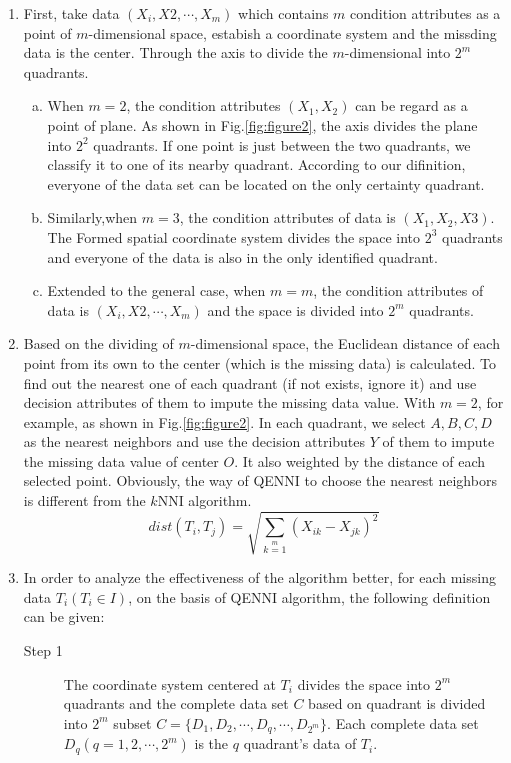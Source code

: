 \documentclass[print]{jicspack}
\begin{document}
\begin{enumerate}[(1)]
\item First, take data $(X_i, X2, \cdots, X_m)$ which contains $m$ condition attributes as a point of $m$-dimensional space, estabish a coordinate system and the missding data is the center. Through the axis to divide the $m$-dimensional into $2^m$ quadrants.
  \begin{enumerate}[a.]
  \item When $m = 2$, the condition attributes $(X_1, X_2)$ can be regard as a point of plane. As shown in Fig.\ref{fig:figure2}, the axis divides the plane into $2^2$ quadrants. If one point is just between the two quadrants, we classify it to one of its nearby quadrant. According to our difinition, everyone of the data set can be located on the only certainty quadrant.
  \item Similarly,when $m = 3$, the condition attributes of data is $(X_1, X_2, X3)$. The Formed spatial coordinate system divides the space into $2^3$ quadrants and everyone of the data is also in the only identified quadrant.
  \item Extended to the general case, when $m = m$, the condition attributes of data is $(X_i, X2, \cdots, X_m)$ and the space is divided into $2^m$ quadrants.
  \end{enumerate}
\item Based on the dividing of $m$-dimensional space, the Euclidean distance of each point from its own to the center (which is the missing data) is calculated. To find out the nearest one of each quadrant (if not exists, ignore it) and use decision attributes of them to impute the missing data value. With $m = 2$, for example, as shown in Fig.\ref{fig:figure2}. In each quadrant,  we select $A, B, C, D$ as the nearest neighbors and use the decision attributes $Y$ of them to impute the missing data value of center $O$. It also weighted by the distance of each selected point. Obviously, the way of QENNI to choose the nearest neighbors is different from the $k$NNI algorithm.
\begin{equation}
\label{eq:1}
dist(T_i, T_j) =\sqrt{ \sum\limits_{k=1}\limits^{m} (X_{ik} - X_{jk})^2}
\end{equation}
\item In order to analyze the effectiveness of the algorithm better, for each missing data $T_i (T_i \in I)$, on the basis of QENNI algorithm,  the following definition can be given:
\begin{description}
\item[Step 1] The coordinate system centered at $T_i$ divides the space into $2^m$ quadrants and the complete data set $C$ based on quadrant is divided into $2^m$ subset $C = \{D_1, D_2, \cdots, D_q, \cdots, D_{2^m}\}$. Each complete data set $D_q (q = 1, 2, \cdots, 2^m)$ is the $q$ quadrant's data of $T_i$.

\end{description}
\end{enumerate}
\end{document}
